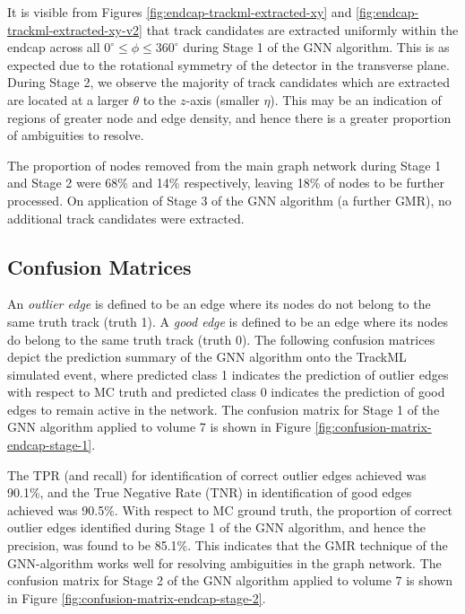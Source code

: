 It is visible from Figures \ref{fig:endcap-trackml-extracted-xy} and \ref{fig:endcap-trackml-extracted-xy-v2} that track candidates are extracted uniformly within the endcap across all $ 0^{\circ} \leq \phi \leq 360^{\circ}$ during Stage 1 of the GNN algorithm. This is as expected due to the rotational symmetry of the detector in the transverse plane. During Stage 2, we observe the majority of track candidates which are extracted are located at a larger $\theta$ to the $z$-axis (smaller $\eta$). This may be an indication of regions of greater node and edge density, and hence there is a greater proportion of ambiguities to resolve.

The proportion of nodes removed from the main graph network during Stage 1 and Stage 2 were 68\% and 14\% respectively, leaving 18\% of nodes to be further processed. On application of Stage 3 of the GNN algorithm (a further GMR), no additional track candidates were extracted.


\subsection{Confusion Matrices}
\label{confusion-matrices-endcap-trackml}

An \textit{outlier edge} is defined to be an edge where its nodes do not belong to the same truth track (truth 1). A \textit{good edge} is defined to be an edge where its nodes do belong to the same truth track (truth 0). The following confusion matrices depict the prediction summary of the GNN algorithm onto the TrackML simulated event, where predicted class 1 indicates the prediction of outlier edges with respect to MC truth and predicted class 0 indicates the prediction of good edges to remain active in the network. The confusion matrix for Stage 1 of the GNN algorithm applied to volume 7 is shown in Figure \ref{fig:confusion-matrix-endcap-stage-1}.


The TPR (and recall) for identification of correct outlier edges achieved was 90.1\%, and the True Negative Rate (TNR) in identification of good edges achieved was 90.5\%. With respect to MC ground truth, the proportion of correct outlier edges identified during Stage 1 of the GNN algorithm, and hence the precision, was found to be 85.1\%. This indicates that the GMR technique of the GNN-algorithm works well for resolving ambiguities in the graph network. The confusion matrix for Stage 2 of the GNN algorithm applied to volume 7 is shown in Figure \ref{fig:confusion-matrix-endcap-stage-2}.


